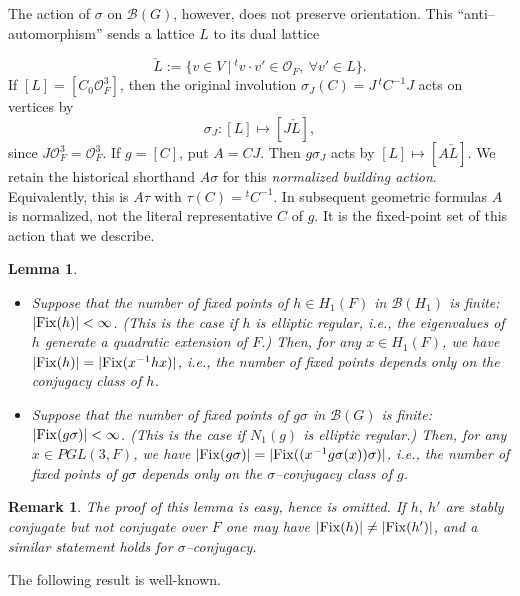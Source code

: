 \documentclass[12pt,letterpaper]{amsart}
\numberwithin{equation}{section}
\newtheorem{lemma}[theorem]{Lemma}
\newtheorem{remark}{Remark}
\theoremstyle{definition}
\theoremstyle{plain}
\providecommand{\cal}{\mathcal}
\def\off{{\cal O}_F}
\def\bbg{{\cal B}(G)}
\def\bbH1{{\cal B}(H_1)}
\begin{document}
The action of $\sigma$ on $\bbg$, however, does not preserve orientation.
This ``anti--automorphism'' sends a lattice $L$ to its dual lattice

\begin{equation}
\label{eqn:4.3}
\check{L} :=\{v \in V\ |\ {^{t}v}\cdot v' \in \off , \ \forall v' \in L\}.
\end{equation}
If $[L]=[C_0\off^3]$, then the original involution
$\sigma_J(C)=J\,{}^tC^{-1}J$ acts on vertices by
\[
\sigma_J:[L]\longmapsto[J\check L],
\]
since $J\off^3=\off^3$. If $g=[C]$, put $A=CJ$. Then
$g\sigma_J$ acts by $[L]\mapsto[A\check L]$.
We retain the historical shorthand $A\sigma$ for this
\emph{normalized building action}. Equivalently, this is $A\tau$
with $\tau(C)={}^tC^{-1}$. In subsequent geometric formulas $A$ is
normalized, not the literal representative $C$ of $g$.
It is the fixed-point set of this action that we describe.

\begin{lemma}
\label{lemma:4.4} 
\begin{itemize}

\item[(a)] 
Suppose that the number of fixed points of 
$h\in H_1(F)$ in $\bbH1$ is finite: $|{\rm Fix}(h)| < \infty$. 
(This is the case if
$h$ is elliptic regular, i.e., the eigenvalues of $h$ generate a quadratic
extension of $F$.) Then, for any $x\in H_1(F)$, we have 
$|{\rm Fix}(h)| =|{\rm Fix}(x^{-1}hx)|$,
i.e., the number of fixed points depends only on the conjugacy class of $h$.

\item[(b)] 
Suppose that the number of fixed points of $g\sigma$ in $\bbg$ is
finite: $|{\rm Fix}(g\sigma )|<\infty$. (This is the case if $N_1(g)$ is 
elliptic regular.) Then, for any $x\in PGL(3,F)$, we have 
$|{\rm Fix}(g\sigma )| = |{\rm Fix}((x^{-1}g\sigma (x))\sigma )|$,
i.e., the number of fixed points of $g\sigma$ depends only on the
$\sigma$--conjugacy class of $g$.
\end{itemize}
\end{lemma}

\begin{remark}
The proof of this lemma is easy, hence is omitted. 
If $h,\ h'$ are stably conjugate but not conjugate over $F$ one
may have $|{\rm Fix}(h)|\not= |{\rm Fix}(h')|$, 
and a similar statement holds for
$\sigma$--conjugacy.
\end{remark}
 
The following result is well-known. 
\end{document}
